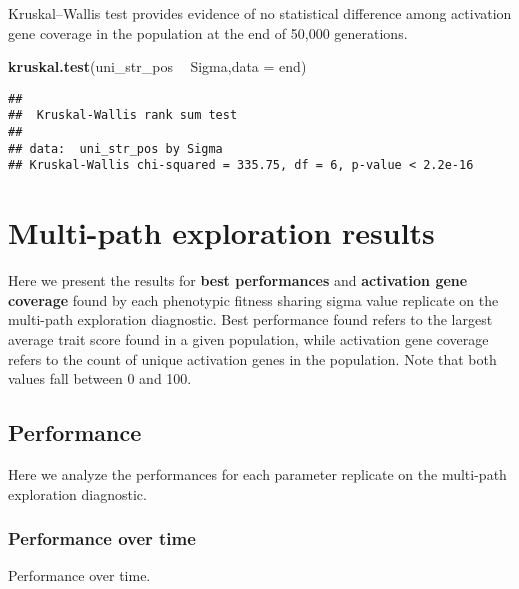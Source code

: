 \documentclass[]{book}
\newenvironment{Shaded}{\begin{snugshade}}{\end{snugshade}}
\newcommand{\DataTypeTok}[1]{\textcolor[rgb]{0.13,0.29,0.53}{#1}}
\newcommand{\KeywordTok}[1]{\textcolor[rgb]{0.13,0.29,0.53}{\textbf{#1}}}
\newcommand{\NormalTok}[1]{#1}
\newcommand{\OperatorTok}[1]{\textcolor[rgb]{0.81,0.36,0.00}{\textbf{#1}}}
\newcommand{\StringTok}[1]{\textcolor[rgb]{0.31,0.60,0.02}{#1}}
\begin{document}
Kruskal--Wallis test provides evidence of no statistical difference among activation gene coverage in the population at the end of 50,000 generations.

\begin{Shaded}
\begin{Highlighting}[]
\KeywordTok{kruskal.test}\NormalTok{(uni_str_pos }\OperatorTok{~}\StringTok{ }\NormalTok{Sigma,}\DataTypeTok{data =}\NormalTok{ end)}
\end{Highlighting}
\end{Shaded}

\begin{verbatim}
## 
##  Kruskal-Wallis rank sum test
## 
## data:  uni_str_pos by Sigma
## Kruskal-Wallis chi-squared = 335.75, df = 6, p-value < 2.2e-16
\end{verbatim}

\hypertarget{multi-path-exploration-results-4}{%
\section{Multi-path exploration results}\label{multi-path-exploration-results-4}}

Here we present the results for \textbf{best performances} and \textbf{activation gene coverage} found by each phenotypic fitness sharing sigma value replicate on the multi-path exploration diagnostic.
Best performance found refers to the largest average trait score found in a given population, while activation gene coverage refers to the count of unique activation genes in the population.
Note that both values fall between 0 and 100.

\hypertarget{performance-4}{%
\subsection{Performance}\label{performance-4}}

Here we analyze the performances for each parameter replicate on the multi-path exploration diagnostic.

\hypertarget{performance-over-time-13}{%
\subsubsection{Performance over time}\label{performance-over-time-13}}

Performance over time.
\end{document}
